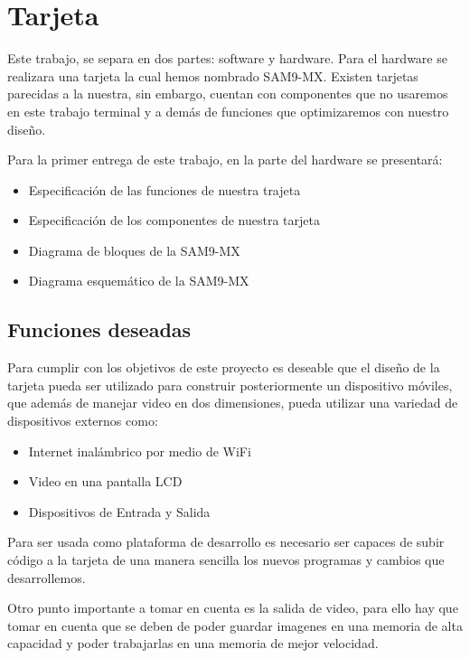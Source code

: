 \section{Tarjeta}
Este trabajo, se separa en dos partes: software y hardware. Para el hardware se realizara una tarjeta la cual hemos nombrado SAM9-MX. Existen tarjetas parecidas a la nuestra, sin embargo, cuentan con componentes que no usaremos en este trabajo terminal y a dem\'as de funciones que optimizaremos con nuestro diseño.\medskip

Para la primer entrega de este trabajo, en la parte del hardware se presentar\'a: \medskip 
\begin{itemize}

\item Especificaci\'on de las funciones de nuestra trajeta
\item Especificaci\'on de los componentes de nuestra tarjeta
\item Diagrama de bloques de la SAM9-MX
\item Diagrama esquem\'atico de la SAM9-MX

\end{itemize}

\subsection{Funciones deseadas}

Para cumplir con los objetivos de este proyecto es deseable que el dise\~no de la tarjeta pueda ser utilizado para construir posteriormente un dispositivo m\'oviles, que adem\'as de manejar video en dos dimensiones, pueda utilizar una variedad de dispositivos externos como:

\begin{itemize}

\item Internet inal\'ambrico por medio de WiFi
\item Video en una pantalla LCD
\item Dispositivos de Entrada y Salida

\end{itemize}

Para ser usada como plataforma de desarrollo es necesario ser capaces de subir c\'odigo a la tarjeta de una manera sencilla los nuevos programas y cambios que desarrollemos.

Otro punto importante a tomar en cuenta es la salida de video, para ello hay que tomar en cuenta que se deben de poder guardar imagenes en una memoria de alta capacidad y poder trabajarlas en una memoria de mejor velocidad.

